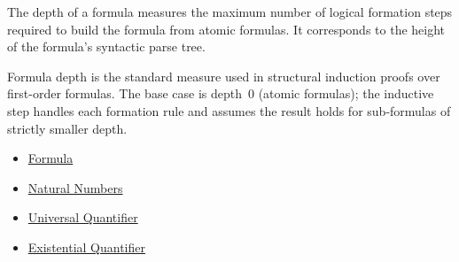 \begin{remark*}[Exposition]
The depth of a formula measures the maximum number of logical formation steps
required to build the formula from atomic formulas. It corresponds to the height
of the formula's syntactic parse tree.
\end{remark*}

\begin{remark*}[Exposition]
Formula depth is the standard measure used in structural induction proofs over
first-order formulas. The base case is depth~$0$ (atomic formulas); the
inductive step handles each formation rule and assumes the result holds for
sub-formulas of strictly smaller depth.
\end{remark*}


\begin{dependencies}
\begin{itemize}
  \item \hyperref[def:formula]{Formula}
  \item \hyperref[def:natural-numbers]{Natural Numbers}
  \item \hyperref[def:universal-q]{Universal Quantifier}
  \item \hyperref[def:existential-q]{Existential Quantifier}
\end{itemize}
\end{dependencies}
